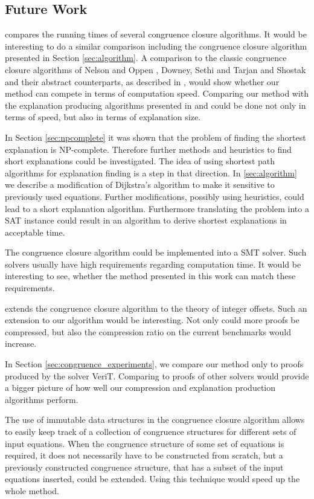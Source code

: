 \subsection{Future Work}

\cite{Bachmair2000} compares the running times of several congruence closure algorithms.
It would be interesting to do a similar comparison including the congruence closure algorithm presented in Section \ref{sec:algorithm}.
A comparison to the classic congruence closure algorithms of Nelson and Oppen \cite{Nelson1980}, Downey, Sethi and Tarjan \cite{Downey1980} and Shostak \cite{Shostak1978} and their abstract counterparts, as described in \cite{Bachmair2000}, would show whether our method can compete in terms of computation speed.
Comparing our method with the explanation producing algorithms presented in \cite{Fontaine2004} and \cite{Nieuwenhuis2005,Nieuwenhuis2007} could be done not only in terms of speed, but also in terms of explanation size.

In Section \ref{sec:npcomplete} it was shown that the problem of finding the shortest explanation is NP-complete.
Therefore further methods and heuristics to find short explanations could be investigated.
The idea of using shortest path algorithms for explanation finding is a step in that direction.
In \ref{sec:algorithm} we describe a modification of Dijkstra's algorithm \cite{Dijkstra1959} to make it sensitive to previously used equations.
Further modifications, possibly using heuristics, could lead to a short explanation algorithm.
Furthermore translating the problem into a SAT instance could result in an algorithm to derive shortest explanations in acceptable time.

The congruence closure algorithm could be implemented into a SMT solver.
Such solvers usually have high requirements regarding computation time.
It would be interesting to see, whether the method presented in this work can match these requirements.

\cite{Nieuwenhuis2007} extends the congruence closure algorithm to the theory of integer offsets.
Such an extension to our algorithm would be interesting.
Not only could more proofs be compressed, but also the compression ratio on the current benchmarks would increase.

In Section \ref{sec:congruence_experiments}, we compare our method only to proofs produced by the solver VeriT.
Comparing to proofs of other solvers would provide a bigger picture of how well our compression and explanation production algorithms perform.

The use of immutable data structures in the congruence closure algorithm allows to easily keep track of a collection of congruence structures for different sets of input equations.
When the congruence structure of some set of equations is required, it does not necessarily have to be constructed from scratch, but a previously constructed congruence structure, that has a subset of the input equations inserted, could be extended.
Using this technique would speed up the whole method.